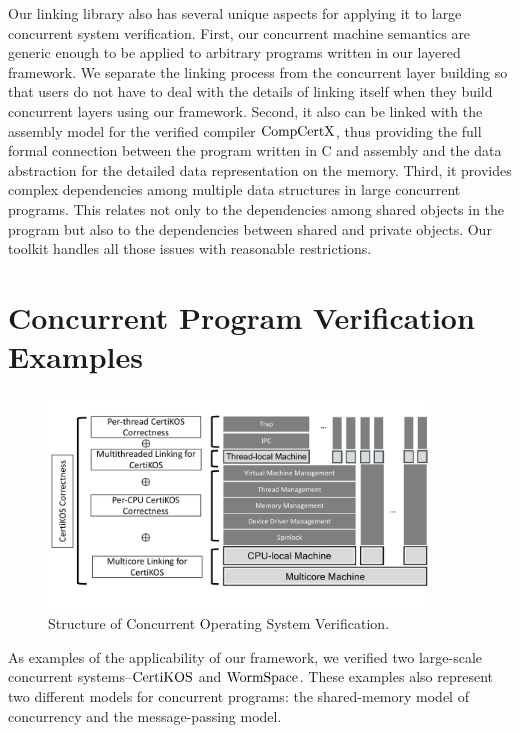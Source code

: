 Our linking library also has several unique aspects for applying it to large concurrent system verification. 
First, our concurrent machine semantics are generic enough to be applied to arbitrary programs written in our layered framework.
We separate the linking process from the concurrent layer building so that users do not have to deal with the details of linking itself when they build concurrent layers using our framework. 
Second, it also can be linked with the assembly model for the verified compiler $\mathrm{CompCertX}$, thus providing the full formal connection between the program written in C and assembly and the data abstraction for the detailed data representation on the memory. 
Third, it provides complex dependencies among multiple data structures in large concurrent programs. 
This relates not only to the dependencies among shared objects in the program but also to the dependencies between shared and private objects. 
Our toolkit handles all those issues with reasonable restrictions. 

\section{Concurrent Program Verification Examples}
\label{chapter:introduction:sec:concurrent-program-verification-examples}


\begin{figure}
\begin{center}
\includegraphics[width=0.9\textwidth, page=1]{figs/intro}
\end{center}
\caption{Structure of Concurrent Operating System Verification.}
\label{fig:intro:certikos-structure}
\end{figure}


As examples of the applicability of our framework, we verified two large-scale concurrent systems--$\mathrm{CertiKOS}$ and $\mathrm{WormSpace}$. 
These examples also represent two different models for concurrent programs: the shared-memory 
model of concurrency and the message-passing model. 

